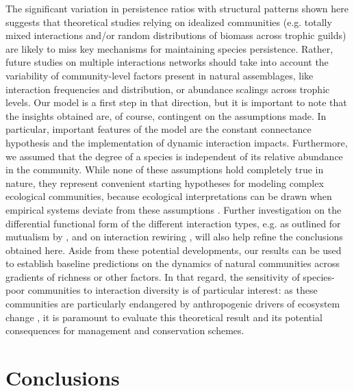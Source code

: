 The significant variation in persistence ratios with structural patterns shown here suggests that theoretical studies relying on idealized communities (e.g. totally mixed interactions and/or random distributions of biomass across trophic guilds) are likely to miss key mechanisms for maintaining species persistence. Rather, future studies on multiple interactions networks should take into account the variability of community-level factors present in natural assemblages, like interaction frequencies and distribution, or abundance scalings across trophic levels. Our model is a first step in that direction, but it is important to note that the insights obtained are, of course, contingent on the assumptions made. In particular, important features of the model are the constant connectance hypothesis and the implementation of dynamic interaction impacts. Furthermore, we assumed that the degree of a species is independent of its relative abundance in the community. While none of these assumptions hold completely true in nature, they represent convenient starting hypotheses for modeling complex ecological communities, because ecological interpretations can be drawn when empirical systems deviate from these assumptions \citep{Banasek-Richter2009}. Further investigation on the differential functional form of the different interaction types, e.g. as outlined for mutualism by \cite{Holland2002}, and on interaction rewiring \citep{Valdovinos2010,Mougi2016b}, will also help refine the conclusions obtained here. Aside from these potential developments, our results can be used to establish baseline predictions on the dynamics of natural communities across gradients of richness or other factors. In that regard, the sensitivity of species-poor communities to interaction diversity is of particular interest: as these communities are particularly endangered by anthropogenic drivers of ecosystem change \citep{Cavieres2009}, it is paramount to evaluate this theoretical result and its potential consequences for management and conservation schemes.

\section{Conclusions}

